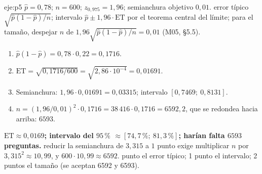 \begin{solucion}{eje:p5}
\datos $\hat p=0{,}78$; $n=600$; $z_{0{,}975}=1{,}96$; semianchura objetivo $0{,}01$.
\planteamiento error típico $\sqrt{\hat p(1-\hat p)/n}$; intervalo $\hat p\pm1{,}96\cdot\mathrm{ET}$ por el teorema central del límite; para el tamaño, despejar $n$ de $1{,}96\sqrt{\hat p(1-\hat p)/n}=0{,}01$ (M05, §5.5).
\pasos
\begin{enumerate}[label=\arabic*.]
  \item $\hat p(1-\hat p)=0{,}78\cdot0{,}22=0{,}1716$.
  \item $\mathrm{ET}=\sqrt{0{,}1716/600}=\sqrt{2{,}86\cdot10^{-4}}=0{,}01691$.
  \item Semianchura: $1{,}96\cdot0{,}01691=0{,}03315$; intervalo $[0{,}7469;\ 0{,}8131]$.
  \item $n=(1{,}96/0{,}01)^{2}\cdot0{,}1716=38\,416\cdot0{,}1716=6592{,}2$, que se redondea hacia arriba: $6593$.
\end{enumerate}
\resultado \textbf{$\mathrm{ET}\approx0{,}0169$; intervalo del $95\,\%$ $\approx[74{,}7\,\%;\ 81{,}3\,\%]$; harían falta $6593$ preguntas.}
\comprobacion reducir la semianchura de $3{,}315$ a $1$ punto exige multiplicar $n$ por $3{,}315^{2}\approx10{,}99$, y $600\cdot10{,}99\approx6592$.
 punto el error típico; 1 punto el intervalo; 2 puntos el tamaño (se aceptan 6592 y 6593).

\end{solucion}

